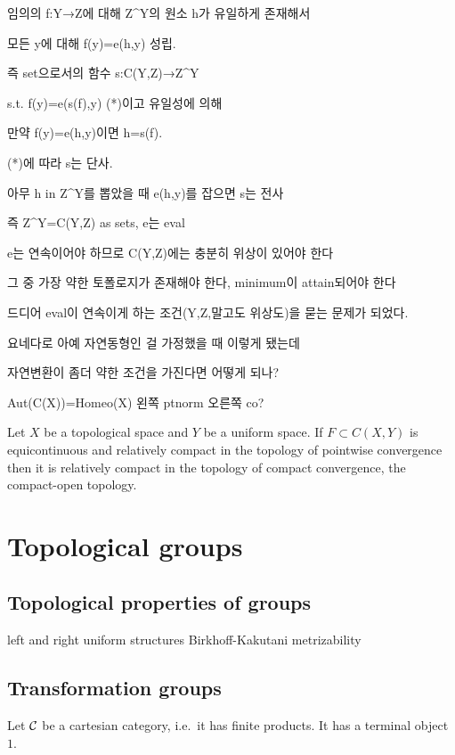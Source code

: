 \documentclass{../../large}
\begin{document}
임의의 f:Y→Z에 대해 Z^Y의 원소 h가 유일하게 존재해서

모든 y에 대해 f(y)=e(h,y) 성립.

즉 set으로서의 함수 s:C(Y,Z)→Z^Y

s.t. f(y)=e(s(f),y) (*)이고 유일성에 의해

만약 f(y)=e(h,y)이면 h=s(f).

(*)에 따라 s는 단사.

아무 h in Z^Y를 뽑았을 때 e(h,y)를 잡으면 s는 전사

즉 Z^Y=C(Y,Z) as sets, e는 eval

e는 연속이어야 하므로 C(Y,Z)에는 충분히 위상이 있어야 한다

그 중 가장 약한 토폴로지가 존재해야 한다, minimum이 attain되어야 한다

드디어 eval이 연속이게 하는 조건(Y,Z,말고도 위상도)을 묻는 문제가 되었다.

요네다로 아예 자연동형인 걸 가정했을 때 이렇게 됐는데

자연변환이 좀더 약한 조건을 가진다면 어떻게 되나?

Aut(C(X))=Homeo(X) 왼쪽 ptnorm 오른쪽 co?

\fi






Let $X$ be a topological space and $Y$ be a uniform space. If $F\subset C(X,Y)$ is equicontinuous and relatively compact in the topology of pointwise convergence then it is relatively compact in the topology of compact convergence, the compact-open topology.





\chapter{Topological groups}

\section{Topological properties of groups}
left and right uniform structures
Birkhoff-Kakutani
metrizability

\section{Transformation groups}

Let $\mathcal{C}$ be a cartesian category, i.e.~it has finite products.
It has a terminal object $1$.
\end{document}
